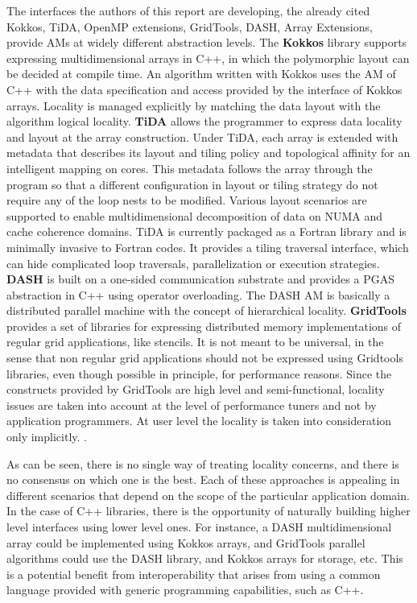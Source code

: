 The interfaces the authors of this report are developing, the already
cited Kokkos, TiDA, OpenMP extensions, GridTools, DASH, Array
Extensions, provide AMs at widely different abstraction levels. 
The {\bf Kokkos} library supports expressing
multidimensional arrays in C++, in which the polymorphic layout can be decided at
compile time. An algorithm written with Kokkos uses the AM of C++ with
the data specification and access provided by the interface of Kokkos
arrays. Locality is managed explicitly by matching the data layout
with the algorithm logical locality. 
{\bf TiDA} allows the programmer to express data locality and layout  at the array construction. 
 Under TiDA, each array is extended with metadata that describes its layout and tiling policy and topological affinity for an intelligent mapping on cores.  This metadata follows the array through the program so that a different configuration in layout or tiling strategy do not require any of the loop nests to be modified. Various layout scenarios are supported to enable multidimensional decomposition of data on NUMA  and cache coherence domains. 
TiDA is currently packaged as a Fortran library and is minimally
invasive to Fortran codes. It provides a tiling traversal interface,
which can hide complicated loop traversals, parallelization or
execution strategies.  {\bf DASH} is built on a one-sided
communication substrate and provides a PGAS abstraction in C++ using
operator overloading. The DASH AM is basically a distributed parallel
machine with the concept of hierarchical locality. {\bf GridTools}
provides a set of libraries for expressing distributed memory
implementations of regular grid applications, like stencils. It is not
meant to be universal, in the sense that non regular grid applications
should not be expressed using Gridtools libraries, even though
possible in principle, for performance reasons. Since the constructs
provided by GridTools are high level and semi-functional, locality
issues are taken into account at the level of performance tuners and
not by application programmers. At user level the locality is taken
into consideration only implicitly. .
  
As can be seen, there is no single way of treating locality concerns,
and there is no consensus on which one is the best. Each of these
approaches is appealing in different scenarios that depend on the
scope of the particular application domain. In the case of C++
libraries, there is the opportunity of naturally building higher level
interfaces using lower level ones. For instance, a DASH
multidimensional array could be implemented using Kokkos arrays, and
GridTools parallel algorithms could use the DASH library, and Kokkos
arrays for storage, etc. This is a potential benefit from
interoperability that arises from using a common language provided
with generic programming capabilities, such as C++.


